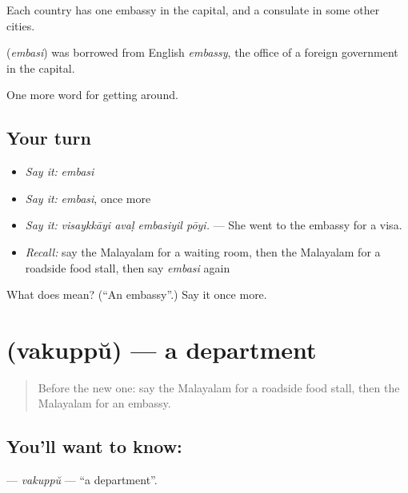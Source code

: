 Each country has one embassy in the capital, and a consulate in some other cities.

\begin{cousinweb}
\textbf{} (\emph{embasi}) was borrowed from English \emph{embassy}, the office of a foreign government in the capital.
\end{cousinweb}

\begin{grammarlens}[title={What you've built}]
One more word for getting around.
\end{grammarlens}

\subsection*{Your turn}
\begin{itemize}
\raggedright
  \item \emph{Say it:} \emph{embasi}
  \item \emph{Say it:} \emph{embasi}, once more
  \item \emph{Say it:} \emph{visaykkāyi avaḷ embasiyil pōyi.} — She went to the embassy for a visa.
  \item \emph{Recall:} say the Malayalam for a waiting room, then the Malayalam for a roadside food stall, then say \emph{embasi} again
\end{itemize}

\begin{tcolorbox}[breakable,colback=teal!4,colframe=teal!35!black,title={Before you move on}]
What does  mean? (\textquotedblleft{}An embassy\textquotedblright{}.) Say it once more.
\end{tcolorbox}
\section[\texorpdfstring{\ml{വകുപ്പ്} (vakuppŭ)}{വകുപ്പ് (vakuppŭ)}]{ (vakuppŭ) — a department}

\label{lesson:ML-C486-vakuppu}



\begin{quote}
Before the new one: say the Malayalam for a roadside food stall, then the Malayalam for an embassy.
\end{quote}

\subsection*{You'll want to know: }
\textbf{} — \emph{vakuppŭ} — \textquotedblleft{}a department\textquotedblright{}.

